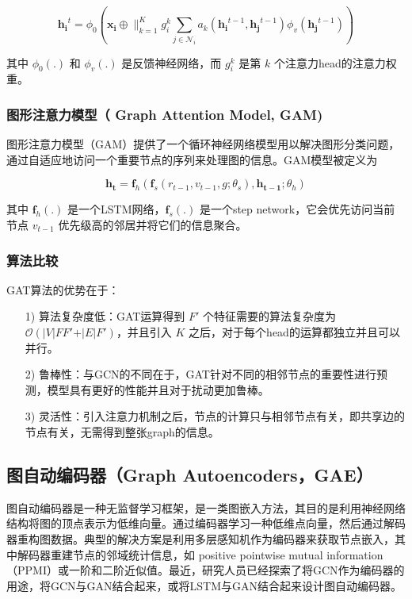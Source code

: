 \documentclass[UTF8]{ctexart}
\begin{document}
\begin{equation} 
\mathbf{h_i}^t = \phi_{0}(\mathbf{x_i} \oplus \parallel_{k=1}^{K} g_{i}^{k} \sum_{j \in \mathcal{N}_i} a_k(\mathbf{h_i}^{t-1},\mathbf{h_j}^{t-1}) \phi_{v}(\mathbf{h_j}^{t-1}))
\end{equation}

其中 $\phi_{0}(.)$ 和 $\phi_{v}(.)$ 是反馈神经网络，而 $g_{i}^{k}$ 是第 $k$ 个注意力head的注意力权重。

\subsubsection{图形注意力模型（ Graph Attention Model, GAM)}

图形注意力模型（GAM）提供了一个循环神经网络模型用以解决图形分类问题，通过自适应地访问一个重要节点的序列来处理图的信息。GAM模型被定义为

\begin{equation}
\mathbf{h_t}=\mathbf{f}_h(\mathbf{f}_s(r_{t-1},v_{t-1},g;\theta_s),\mathbf{h_{t-1}};\theta_h)
\end{equation}

其中 $\mathbf{f}_h(.)$ 是一个LSTM网络，$\mathbf{f}_s(.)$ 是一个step network，它会优先访问当前节点 $v_{t-1}$ 优先级高的邻居并将它们的信息聚合。

\subsubsection{算法比较}

GAT算法的优势在于：

\begin{itemize}
\item [1)] 
算法复杂度低：GAT运算得到 $F'$ 个特征需要的算法复杂度为 $\mathcal{O}(\vert V \vert FF'+\vert E \vert F')$，并且引入 $K$ 之后，对于每个head的运算都独立并且可以并行。
\item [2)] 
鲁棒性：与GCN的不同在于，GAT针对不同的相邻节点的重要性进行预测，模型具有更好的性能并且对于扰动更加鲁棒。
\item [3)] 
灵活性：引入注意力机制之后，节点的计算只与相邻节点有关，即共享边的节点有关，无需得到整张graph的信息。
\end{itemize}

\subsection{图自动编码器（Graph Autoencoders，GAE）}

图自动编码器是一种无监督学习框架，是一类图嵌入方法，其目的是利用神经网络结构将图的顶点表示为低维向量。通过编码器学习一种低维点向量，然后通过解码器重构图数据。典型的解决方案是利用多层感知机作为编码器来获取节点嵌入，其中解码器重建节点的邻域统计信息，如 positive pointwise mutual information （PPMI）或一阶和二阶近似值。最近，研究人员已经探索了将GCN作为编码器的用途，将GCN与GAN结合起来，或将LSTM与GAN结合起来设计图自动编码器。
\end{document}
